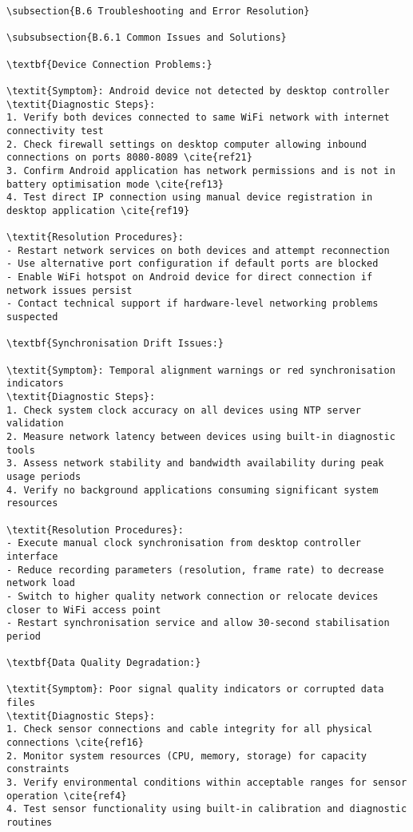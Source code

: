 \begin{verbatim}
\subsection{B.6 Troubleshooting and Error Resolution}

\subsubsection{B.6.1 Common Issues and Solutions}

\textbf{Device Connection Problems:}

\textit{Symptom}: Android device not detected by desktop controller
\textit{Diagnostic Steps}:
1. Verify both devices connected to same WiFi network with internet connectivity test
2. Check firewall settings on desktop computer allowing inbound connections on ports 8080-8089 \cite{ref21}
3. Confirm Android application has network permissions and is not in battery optimisation mode \cite{ref13}
4. Test direct IP connection using manual device registration in desktop application \cite{ref19}

\textit{Resolution Procedures}:
- Restart network services on both devices and attempt reconnection
- Use alternative port configuration if default ports are blocked
- Enable WiFi hotspot on Android device for direct connection if network issues persist
- Contact technical support if hardware-level networking problems suspected

\textbf{Synchronisation Drift Issues:}

\textit{Symptom}: Temporal alignment warnings or red synchronisation indicators
\textit{Diagnostic Steps}:
1. Check system clock accuracy on all devices using NTP server validation
2. Measure network latency between devices using built-in diagnostic tools
3. Assess network stability and bandwidth availability during peak usage periods
4. Verify no background applications consuming significant system resources

\textit{Resolution Procedures}:
- Execute manual clock synchronisation from desktop controller interface
- Reduce recording parameters (resolution, frame rate) to decrease network load
- Switch to higher quality network connection or relocate devices closer to WiFi access point
- Restart synchronisation service and allow 30-second stabilisation period

\textbf{Data Quality Degradation:}

\textit{Symptom}: Poor signal quality indicators or corrupted data files
\textit{Diagnostic Steps}:
1. Check sensor connections and cable integrity for all physical connections \cite{ref16}
2. Monitor system resources (CPU, memory, storage) for capacity constraints
3. Verify environmental conditions within acceptable ranges for sensor operation \cite{ref4}
4. Test sensor functionality using built-in calibration and diagnostic routines


\end{verbatim}
